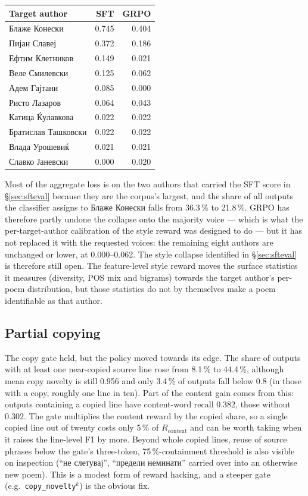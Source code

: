 \documentclass[11pt]{article}
\begin{document}
\begin{center}
\begin{tabular}{lrr}
\toprule
Target author & SFT & GRPO \\
\midrule
Блаже Конески       & 0.745 & 0.404 \\
Пијан Славеј        & 0.372 & 0.186 \\
Ефтим Клетников     & 0.149 & 0.021 \\
Веле Смилевски      & 0.125 & 0.062 \\
Адем Гајтани        & 0.085 & 0.000 \\
Ристо Лазаров       & 0.064 & 0.043 \\
Катица Ќулавкова    & 0.022 & 0.022 \\
Братислав Ташковски & 0.022 & 0.022 \\
Влада Урошевиќ      & 0.021 & 0.021 \\
Славко Јаневски     & 0.000 & 0.020 \\
\bottomrule
\end{tabular}
\end{center}

\noindent
Most of the aggregate loss is on the two authors that carried the SFT score
in \S\ref{sec:sfteval} because they are the corpus's largest, and the
share of all outputs the classifier assigns to Блаже Конески falls from
36.3\,\% to 21.8\,\%. GRPO has therefore partly undone the collapse onto the
majority voice --- which is what the per-target-author calibration of the
style reward was designed to do --- but it has not replaced it with the
requested voices: the remaining eight authors are unchanged or lower, at
0.000--0.062. The style collapse identified in \S\ref{sec:sfteval} is
therefore still open. The feature-level style reward moves the surface
statistics it measures (diversity, POS mix and bigrams) towards the target
author's per-poem distribution, but those statistics do not by themselves
make a poem identifiable as that author.

\subsection{Partial copying}

The copy gate held, but the policy moved towards its edge. The share of
outputs with at least one near-copied source line rose from 8.1\,\% to
44.4\,\%, although mean copy novelty is still 0.956 and only 3.4\,\% of
outputs fall below 0.8 (in those with a copy, roughly one line in ten). Part
of the content gain comes from this: outputs containing a copied line have
content-word recall 0.382, those without 0.302. The gate multiplies the
content reward by the copied share, so a single copied line out of twenty
costs only 5\,\% of $R_{\mathrm{content}}$ and can be worth taking when it
raises the line-level F1 by more. Beyond whole copied lines, reuse of source
phrases below the gate's three-token, 75\,\%-containment threshold is also
visible on inspection (``не слетувај'', ``предели неминати'' carried over
into an otherwise new poem). This is a modest form of reward hacking, and a
steeper gate (e.g.\ \texttt{copy\_novelty}$^k$) is the obvious fix.
\end{document}
